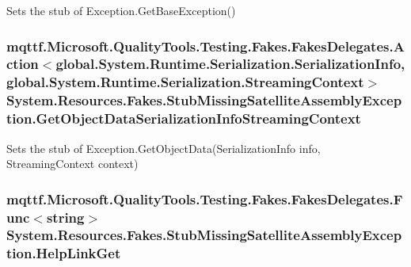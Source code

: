 Sets the stub of Exception.\-Get\-Base\-Exception()

\hypertarget{class_system_1_1_resources_1_1_fakes_1_1_stub_missing_satellite_assembly_exception_a7ed59a1f4fc4629da6aeded766c882c4}{
\subsubsection[{Get\-Object\-Data\-Serialization\-Info\-Streaming\-Context}]{\setlength{\rightskip}{0pt plus 5cm}mqttf.\-Microsoft.\-Quality\-Tools.\-Testing.\-Fakes.\-Fakes\-Delegates.\-Action$<$global.\-System.\-Runtime.\-Serialization.\-Serialization\-Info, global.\-System.\-Runtime.\-Serialization.\-Streaming\-Context$>$ System.\-Resources.\-Fakes.\-Stub\-Missing\-Satellite\-Assembly\-Exception.\-Get\-Object\-Data\-Serialization\-Info\-Streaming\-Context}}\label{class_system_1_1_resources_1_1_fakes_1_1_stub_missing_satellite_assembly_exception_a7ed59a1f4fc4629da6aeded766c882c4}


Sets the stub of Exception.\-Get\-Object\-Data(\-Serialization\-Info info, Streaming\-Context context)

\hypertarget{class_system_1_1_resources_1_1_fakes_1_1_stub_missing_satellite_assembly_exception_a2832350010389b9f8fc5193d616f7717}{
\subsubsection[{Help\-Link\-Get}]{\setlength{\rightskip}{0pt plus 5cm}mqttf.\-Microsoft.\-Quality\-Tools.\-Testing.\-Fakes.\-Fakes\-Delegates.\-Func$<$string$>$ System.\-Resources.\-Fakes.\-Stub\-Missing\-Satellite\-Assembly\-Exception.\-Help\-Link\-Get}}\label{class_system_1_1_resources_1_1_fakes_1_1_stub_missing_satellite_assembly_exception_a2832350010389b9f8fc5193d616f7717}



